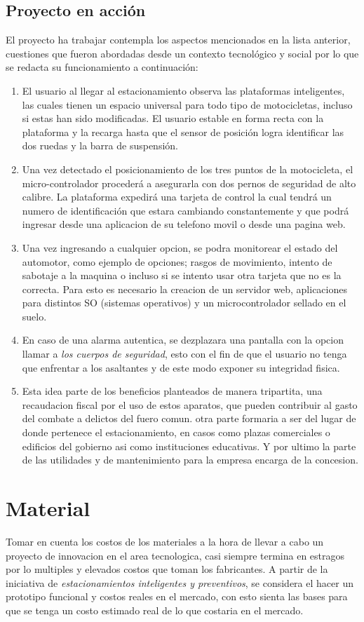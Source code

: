 \documentclass[11pt]{article}
\begin{document}
\subsection{Proyecto en acción}
El proyecto ha trabajar contempla los aspectos mencionados en la lista anterior, cuestiones que fueron abordadas desde un contexto tecnológico y social por lo que se redacta su funcionamiento a continuación:
\begin{enumerate}
	\item El usuario al llegar al estacionamiento observa las plataformas inteligentes, las cuales tienen un espacio universal para todo tipo de motocicletas, incluso si estas han sido modificadas. El usuario estable en forma recta con la plataforma y la recarga hasta que el sensor de posición logra identificar las dos ruedas y la barra de suspensión.
	\item Una vez detectado el posicionamiento de los tres puntos de la motocicleta, el micro-controlador procederá a asegurarla con dos pernos de seguridad de alto calibre. La plataforma expedirá una tarjeta de control la cual tendrá un numero de identificación que estara cambiando constantemente y que podrá ingresar desde una aplicacion de su telefono movil o desde una pagina web.
	\item Una vez ingresando a cualquier opcion, se podra monitorear el estado del automotor, como ejemplo de opciones; rasgos de movimiento, intento de sabotaje a la maquina o incluso si se intento usar otra tarjeta que no es la correcta. Para esto es necesario la creacion de un servidor web, aplicaciones para distintos SO (sistemas operativos) y un microcontrolador sellado en el suelo.
	\item En caso de una alarma autentica, se dezplazara una pantalla con la opcion llamar a \emph{los cuerpos de seguridad}, esto con el fin de que el usuario no tenga que enfrentar a los asaltantes y de este modo exponer su integridad fisica.
	\item Esta idea parte de los beneficios planteados de manera tripartita, una recaudacion fiscal por el uso de estos aparatos, que pueden contribuir al gasto del combate a delictos del fuero comun. otra parte formaria a ser del lugar de donde pertenece el estacionamiento, en casos como plazas comerciales o edificios del gobierno asi como instituciones educativas. Y por ultimo la parte de las utilidades y de mantenimiento para la empresa encarga de la concesion.
	
\end{enumerate}
\newpage
\section{Material}
Tomar en cuenta los costos de los materiales a la hora de llevar a cabo un proyecto de innovacion en el area tecnologica, casi siempre termina en estragos por lo multiples y elevados costos que toman los fabricantes. A partir de la iniciativa de \emph{estacionamientos inteligentes y preventivos}, se considera el hacer un prototipo funcional y costos reales en el mercado, con esto sienta las bases para que se tenga un costo estimado real de lo que costaria en el mercado.
\end{document}
